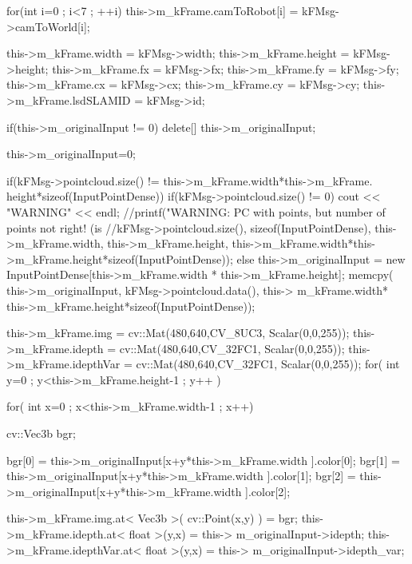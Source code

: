 \begin{DoxyCode}
                                                                             {

        for(int i=0 ; i<7 ; ++i) {
                this->m_kFrame.camToRobot[i] = kFMsg->camToWorld[i];
        }

        this->m_kFrame.width = kFMsg->width;
        this->m_kFrame.height = kFMsg->height;
        this->m_kFrame.fx = kFMsg->fx;
        this->m_kFrame.fy = kFMsg->fy;
        this->m_kFrame.cx = kFMsg->cx;
        this->m_kFrame.cy = kFMsg->cy;
        this->m_kFrame.lsdSLAMID = kFMsg->id;

        if(this->m_originalInput != 0) {
                delete[] this->m_originalInput;
        }

        this->m_originalInput=0;

        if(kFMsg->pointcloud.size() != this->m_kFrame.width*this->m_kFrame.
      height*sizeof(InputPointDense)) {
                if(kFMsg->pointcloud.size() != 0)
                {
                        cout << "WARNING" << endl;
                        //printf("WARNING: PC with points, but number of points
       not right! (is %
                                        //kFMsg->pointcloud.size(),
       sizeof(InputPointDense), this->m_kFrame.width, this->m_kFrame.height,
       this->m_kFrame.width*this->m_kFrame.height*sizeof(InputPointDense));
                }
        }
        else {
                this->m_originalInput = new InputPointDense[this->m_kFrame.width
      * this->m_kFrame.height];
                memcpy( this->m_originalInput, kFMsg->pointcloud.data(), this->
      m_kFrame.width* this->m_kFrame.height*sizeof(InputPointDense));
        }

        this->m_kFrame.img = cv::Mat(480,640,CV_8UC3, Scalar(0,0,255));
        this->m_kFrame.idepth = cv::Mat(480,640,CV_32FC1, Scalar(0,0,255));
        this->m_kFrame.idepthVar = cv::Mat(480,640,CV_32FC1, Scalar(0,0,255));
        for( int y=0 ; y<this->m_kFrame.height-1 ; y++ ) {
                for( int x=0 ; x<this->m_kFrame.width-1 ; x++) {
                        cv::Vec3b bgr;

                        bgr[0] = this->m_originalInput[x+y*this->m_kFrame.width
      ].color[0];
                        bgr[1] = this->m_originalInput[x+y*this->m_kFrame.width
      ].color[1];
                        bgr[2] = this->m_originalInput[x+y*this->m_kFrame.width
      ].color[2];

                        this->m_kFrame.img.at< Vec3b >( cv::Point(x,y) ) = bgr;
                        this->m_kFrame.idepth.at< float >(y,x) = this->
      m_originalInput->idepth;
                        this->m_kFrame.idepthVar.at< float >(y,x) = this->
      m_originalInput->idepth_var;
                }
        }
}
\end{DoxyCode}
